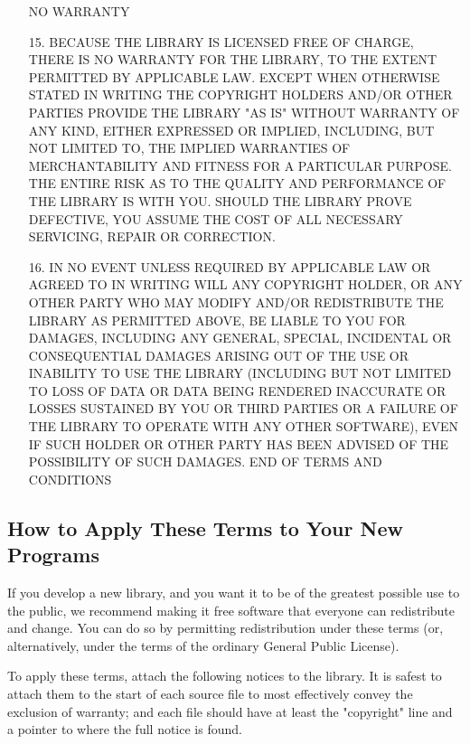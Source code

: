 \begin{itemize}
\bc
			    NO WARRANTY
\ec
\item[15.]  BECAUSE THE LIBRARY IS LICENSED FREE OF CHARGE, THERE IS NO
WARRANTY FOR THE LIBRARY, TO THE EXTENT PERMITTED BY APPLICABLE LAW.
EXCEPT WHEN OTHERWISE STATED IN WRITING THE COPYRIGHT HOLDERS AND/OR
OTHER PARTIES PROVIDE THE LIBRARY "AS IS" WITHOUT WARRANTY OF ANY
KIND, EITHER EXPRESSED OR IMPLIED, INCLUDING, BUT NOT LIMITED TO, THE
IMPLIED WARRANTIES OF MERCHANTABILITY AND FITNESS FOR A PARTICULAR
PURPOSE.  THE ENTIRE RISK AS TO THE QUALITY AND PERFORMANCE OF THE
LIBRARY IS WITH YOU.  SHOULD THE LIBRARY PROVE DEFECTIVE, YOU ASSUME
THE COST OF ALL NECESSARY SERVICING, REPAIR OR CORRECTION.

\item[16.]  IN NO EVENT UNLESS REQUIRED BY APPLICABLE LAW OR AGREED TO IN
WRITING WILL ANY COPYRIGHT HOLDER, OR ANY OTHER PARTY WHO MAY MODIFY
AND/OR REDISTRIBUTE THE LIBRARY AS PERMITTED ABOVE, BE LIABLE TO YOU
FOR DAMAGES, INCLUDING ANY GENERAL, SPECIAL, INCIDENTAL OR
CONSEQUENTIAL DAMAGES ARISING OUT OF THE USE OR INABILITY TO USE THE
LIBRARY (INCLUDING BUT NOT LIMITED TO LOSS OF DATA OR DATA BEING
RENDERED INACCURATE OR LOSSES SUSTAINED BY YOU OR THIRD PARTIES OR A
FAILURE OF THE LIBRARY TO OPERATE WITH ANY OTHER SOFTWARE), EVEN IF
SUCH HOLDER OR OTHER PARTY HAS BEEN ADVISED OF THE POSSIBILITY OF SUCH
DAMAGES.
\bc
		     END OF TERMS AND CONDITIONS
\ec
\end{itemize}

\subsection{How to Apply These Terms to Your New Programs}

  If you develop a new library, and you want it to be of the greatest
possible use to the public, we recommend making it free software that
everyone can redistribute and change.  You can do so by permitting
redistribution under these terms (or, alternatively, under the terms of the
ordinary General Public License).

  To apply these terms, attach the following notices to the library.  It is
safest to attach them to the start of each source file to most effectively
convey the exclusion of warranty; and each file should have at least the
"copyright" line and a pointer to where the full notice is found.

